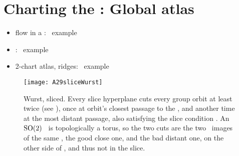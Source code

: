 
\section{Charting the \reducedsp: Global atlas}
\label{s:chart}

    \ifdraft\color{blue}
    \begin{itemize}
      \item flow in a \slice: \cLf\ example
      \item {\chartBord}: \cLf\ example
      \item 2-chart atlas, ridges:  \cLf\ example
    \end{itemize}
    \color{black}\fi


\begin{figure}
   \centering
\texttt{[image: A29sliceWurst]}
   \caption{\label{fig:sliceimage}
Wurst, sliced.
      Every slice hyperplane cuts every group orbit at least twice (see
      ), once at orbit's closest passage to the
      {\template}, and another time at the most distant passage, also
      satisfying the slice condition . An $\textrm{SO}(2)$ \rpo\
      is topologically a torus, so the two cuts are the two \po\ images
      of the same \rpo, the good close one, and the bad distant one, on
      the other side of {\sliceBord}, and thus not in the slice.
   }
\end{figure}


